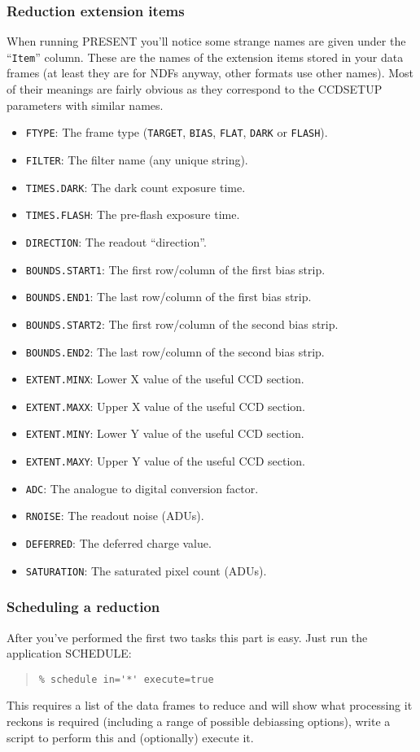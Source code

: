 \documentclass[twoside,11pt]{article}
\newcommand{\htmlref}[2]{#1}
\newcommand{\xlabel}[1]{}
\renewcommand{\_}{\texttt{\symbol{95}}}
\newenvironment{myquote}{\begin{quote}\begin{small}}{\end{small}\end{quote}}
\newcommand{\text}[1]{{\small \tt #1}}
\newcommand{\xroutine}[1]{\htmlref{{\sc #1}}{#1}}
\begin{document}
\subsubsection{Reduction extension items \xlabel{reductionitems}}
When running \xroutine{PRESENT} you'll notice some strange names are
given under the ``\text{Item}'' column. These are the names of the
extension items stored in your data frames (at least they are for NDFs
anyway, other formats use other names). Most of their meanings are
fairly obvious as they correspond to the \xroutine{CCDSETUP}
parameters with similar names.
\begin{itemize}
\item \text{FTYPE}: The frame type (\text{TARGET}, \text{BIAS},
\text{FLAT}, \text{DARK} or \text{FLASH}).
\item \text{FILTER}: The filter name (any unique string).
\item \text{TIMES.DARK}: The dark count exposure time.
\item \text{TIMES.FLASH}: The pre-flash exposure time.
\item \text{DIRECTION}: The readout ``direction''.
\item \text{BOUNDS.START1}: The first row/column of the first bias strip.
\item \text{BOUNDS.END1}: The last row/column of the first bias strip.
\item \text{BOUNDS.START2}: The first row/column of the second bias strip.
\item \text{BOUNDS.END2}: The last row/column of the second bias strip.
\item \text{EXTENT.MINX}: Lower X value of the useful CCD section.
\item \text{EXTENT.MAXX}: Upper X value of the useful CCD section.
\item \text{EXTENT.MINY}: Lower Y value of the useful CCD section.
\item \text{EXTENT.MAXY}: Upper Y value of the useful CCD section.
\item \text{ADC}: The analogue to digital conversion factor.
\item \text{RNOISE}: The readout noise (ADUs).
\item \text{DEFERRED}: The deferred charge value.
\item \text{SATURATION}: The saturated pixel count (ADUs).
\end{itemize}

\subsubsection{Scheduling a reduction}
After you've performed the first two tasks this part is easy. Just run the
application \xroutine{SCHEDULE}:
\begin{myquote}
\begin{verbatim}
% schedule in='*' execute=true
\end{verbatim}
\end{myquote}
This requires a list of the data frames to reduce and will show what
processing it reckons is required (including a range of possible
debiassing options), write a script to perform this and (optionally)
execute it.
\end{document}
